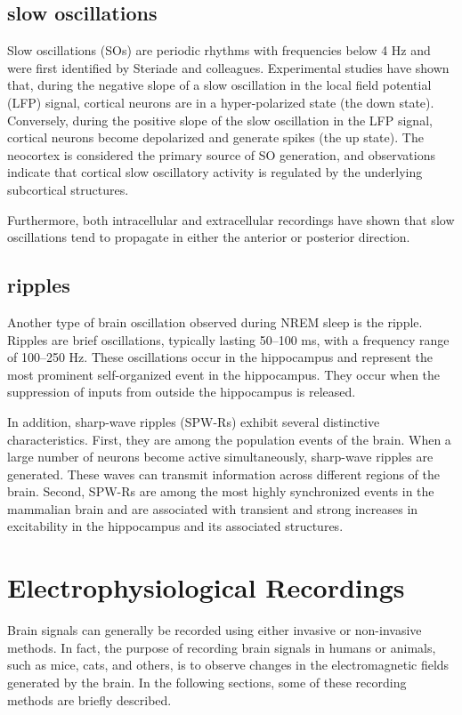 \documentclass[12pt]{report}
\begin{document}
	
	\subsection{slow oscillations}
	\label{sec:slow_oscillations}
	Slow oscillations (SOs) are periodic rhythms with frequencies below 4 Hz and were first identified by Steriade and colleagues\cite{Steriade1993}. Experimental studies have shown that, during the negative slope of a slow oscillation in the local field potential (LFP) signal, cortical neurons are in a hyper-polarized state (the down state). Conversely, during the positive slope of the slow oscillation in the LFP signal, cortical neurons become depolarized and generate spikes (the up state)\cite{Contreras1995}. The neocortex is considered the primary source of SO generation, and observations indicate that cortical slow oscillatory activity is regulated by the underlying subcortical structures\cite{Timofeev2020}.
	
	Furthermore, both intracellular and extracellular recordings have shown that slow oscillations tend to propagate in either the anterior or posterior direction\cite{Luczak2007}\cite{Massimini2004}.
	
	\subsection{ripples}
	\label{sec:ripples}
	Another type of brain oscillation observed during NREM sleep is the ripple. Ripples are brief oscillations, typically lasting 50–100 ms, with a frequency range of 100–250 Hz. These oscillations occur in the hippocampus\cite{Buzski2006} and represent the most prominent self-organized event in the hippocampus. They occur when the suppression of inputs from outside the hippocampus is released\cite{Contreras1995}.
	
	In addition, sharp-wave ripples (SPW-Rs) exhibit several distinctive characteristics. First, they are among the population events of the brain. When a large number of neurons become active simultaneously, sharp-wave ripples are generated. These waves can transmit information across different regions of the brain\cite{Buzski1992}. Second, SPW-Rs are among the most highly synchronized events in the mammalian brain and are associated with transient and strong increases in excitability in the hippocampus and its associated structures\cite{Buzski2015}.
	
	\section{Electrophysiological Recordings}
	\label{sec:Electrophysiological_Recordings}
	Brain signals can generally be recorded using either invasive or non-invasive methods. In fact, the purpose of recording brain signals in humans or animals, such as mice, cats, and others, is to observe changes in the electromagnetic fields generated by the brain. In the following sections, some of these recording methods are briefly described.
	
\end{document}

